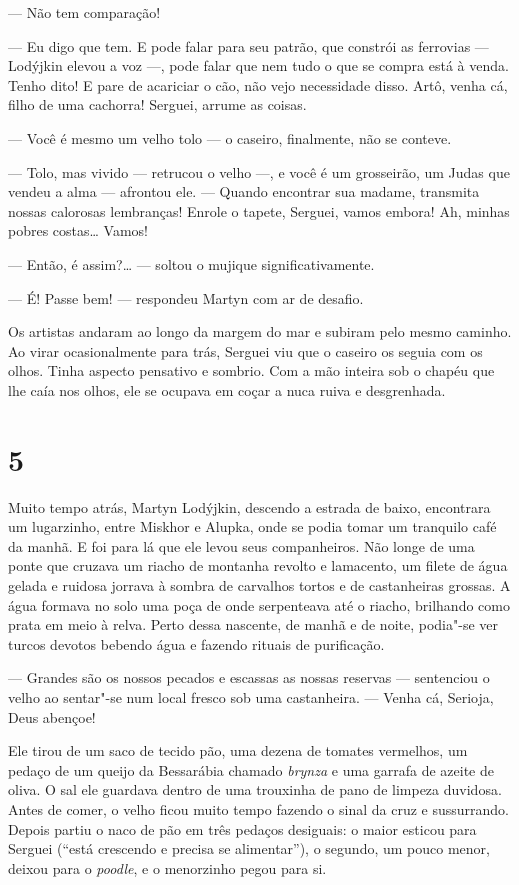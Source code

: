 --- Não tem comparação!

--- Eu digo que tem. E pode falar para seu patrão, que constrói as
ferrovias --- Lodýjkin elevou a voz ---, pode falar que nem tudo o que
se compra está à venda. Tenho dito! E pare de acariciar o cão, não vejo
necessidade disso. Artô, venha cá, filho de uma cachorra! Serguei,
arrume as coisas.

--- Você é mesmo um velho tolo --- o caseiro, finalmente, não se
conteve.

--- Tolo, mas vivido --- retrucou o velho ---, e você é um grosseirão,
um Judas que vendeu a alma --- afrontou ele. --- Quando encontrar sua
madame, transmita nossas calorosas lembranças! Enrole o tapete, Serguei,
vamos embora! Ah, minhas pobres costas\ldots{} Vamos!

--- Então, é assim?\ldots{} --- soltou o mujique significativamente.

--- É! Passe bem! --- respondeu Martyn com ar de desafio.

Os artistas andaram ao longo da margem do mar e subiram pelo mesmo
caminho. Ao virar ocasionalmente para trás, Serguei viu que o caseiro os
seguia com os olhos. Tinha aspecto pensativo e sombrio. Com a mão
inteira sob o chapéu que lhe caía nos olhos, ele se ocupava em coçar a
nuca ruiva e desgrenhada.

\section{5}

Muito tempo atrás, Martyn Lodýjkin, descendo a estrada de baixo,
encontrara um lugarzinho, entre Miskhor e Alupka, onde se podia tomar um
tranquilo café da manhã. E foi para lá que ele levou seus companheiros.
Não longe de uma ponte que cruzava um riacho de montanha revolto e
lamacento, um filete de água gelada e ruidosa jorrava à sombra de
carvalhos tortos e de castanheiras grossas. A água formava no solo uma
poça de onde serpenteava até o riacho, brilhando como prata em meio à
relva. Perto dessa nascente, de manhã e de noite, podia"-se ver turcos
devotos bebendo água e fazendo rituais de purificação.

--- Grandes são os nossos pecados e escassas as nossas reservas ---
sentenciou o velho ao sentar"-se num local fresco sob uma castanheira.
--- Venha cá, Serioja, Deus abençoe!

Ele tirou de um saco de tecido pão, uma dezena de tomates vermelhos, um
pedaço de um queijo da Bessarábia chamado \emph{brynza} e uma garrafa de
azeite de oliva. O sal ele guardava dentro de uma trouxinha de pano de
limpeza duvidosa. Antes de comer, o velho ficou muito tempo fazendo o
sinal da cruz e sussurrando. Depois partiu o naco de pão em três pedaços
desiguais: o maior esticou para Serguei (``está crescendo e precisa se
alimentar''), o segundo, um pouco menor, deixou para o \emph{poodle}, e o
menorzinho pegou para si.

